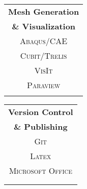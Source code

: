 \begin{minipage}{\textwidth}
\begin{center}
\begin{minipage}{0.15\textwidth}
\end{minipage}%
\begin{minipage}{0.24\textwidth}
\begin{tabular}{c}
{\large\textbf{Mesh Generation}}\\
	{\large\textbf{ \& Visualization}}\\ [2mm]
               \textsc{Abaqus/CAE} \\
               \textsc{Cubit/Trelis} \\
               \textsc{VisIt} \\
               \textsc{Paraview} \\
               \textsc{} \\
\end{tabular}
\end{minipage}%
\begin{minipage}{0.24\textwidth}
\begin{tabular}{c}
{\large\textbf{Version Control}}\\
	{\large\textbf{\& Publishing}}\\ [2mm]
	\textsc{Git} \\ 
               \textsc{Latex} \\
               \textsc{Microsoft Office} \\
               \textsc{} \\
               \textsc{} \\
\end{tabular}
\end{minipage}
	\end{center}
\end{minipage}
